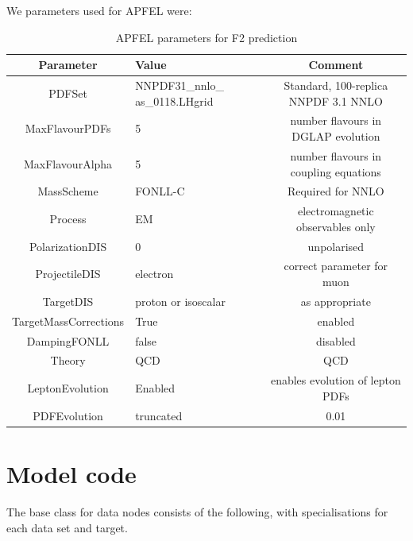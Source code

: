 \documentclass[12pt,a4paper]{report}
\begin{document}
We parameters used for APFEL were:
\begin{table}[H]
\begin{center}
\begin{tabular}{|c|p{3cm}|c|}
\hline
Parameter & Value & Comment\\
\hline
PDFSet & NNPDF31\_nnlo\_ as\_0118.LHgrid & Standard, 100-replica NNPDF 3.1 NNLO\\
MaxFlavourPDFs & 5 & number flavours in DGLAP evolution\\
MaxFlavourAlpha & 5 & number flavours in coupling equations\\
MassScheme & FONLL-C & Required for NNLO\\
Process & EM & electromagnetic observables only\\
PolarizationDIS & 0 & unpolarised\\
ProjectileDIS & electron & correct parameter for muon\\
TargetDIS & proton or isoscalar & as appropriate\\
TargetMassCorrections & True & enabled\\
DampingFONLL & false & disabled\\
Theory & QCD & QCD\\
LeptonEvolution & Enabled & enables evolution of lepton PDFs\\
PDFEvolution & truncated & 0.01\\
\hline
\end{tabular}
\caption{APFEL parameters for F2 prediction}
\label{tb:APFEL_params}
\end{center}
\end{table}

\section{Model code} \label{code:Models}

The base class for data nodes consists of the following, with specialisations for each data set and target.
\end{document}

